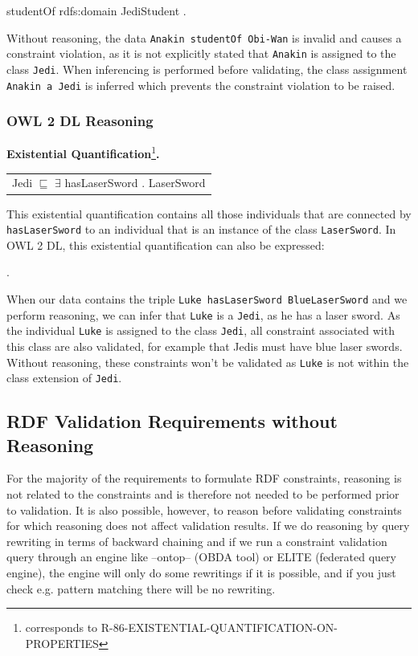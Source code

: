\documentclass{llncs}
\newcommand{\ms}[1]{\texttt{#1}}
\newenvironment{DL}{
  \scriptsize
  \sffamily
  \vspace{0.3cm}
  \begin{tabular}{l}

}{
  \end{tabular}
  \linebreak
}
\begin{document}
\begin{ex}
studentOf rdfs:domain JediStudent .
\end{ex}

Without reasoning, the data \ms{Anakin studentOf Obi-Wan} is invalid and causes a constraint violation, as it is not explicitly stated that \ms{Anakin} is assigned to the class \ms{Jedi}. 
When inferencing is performed before validating, the class assignment \ms{Anakin a Jedi} is inferred which prevents the constraint violation to be raised.

\subsubsection{OWL 2 DL Reasoning}

\textbf{Existential Quantification}\footnote{corresponds to R-86-EXISTENTIAL-QUANTIFICATION-ON-PROPERTIES}\textbf{.}

\begin{DL}
Jedi $\sqsubseteq$ $\exists$ hasLaserSword . LaserSword
\end{DL}

This existential quantification contains all those individuals that are connected by \ms{hasLaserSword} to an individual that is an instance of the class \ms{LaserSword}.
In OWL 2 DL, this existential quantification can also be expressed:

\begin{ex}
 .
\end{ex}

When our data contains the triple \ms{Luke hasLaserSword BlueLaserSword} and we perform reasoning, we can infer that \ms{Luke} is a \ms{Jedi}, as he has a laser sword.
As the individual \ms{Luke} is assigned to the class \ms{Jedi}, all constraint associated with this class are also validated, for example that Jedis must have blue laser swords.
Without reasoning, these constraints won't be validated as \ms{Luke} is not within the class extension of \ms{Jedi}.

\subsection{RDF Validation Requirements without Reasoning}

For the majority of the requirements to formulate RDF constraints, reasoning is not related to the constraints and is therefore not needed to be performed prior to validation. 
It is also possible, however, to reason before validating constraints for which reasoning does not affect validation results.
If we do reasoning by query rewriting in terms of backward chaining and if we run a constraint validation query through an engine like --ontop-- (OBDA tool) or ELITE (federated query engine), the engine will only do some rewritings if it is possible, and if you just check e.g. pattern matching there will be no rewriting.
\end{document}
